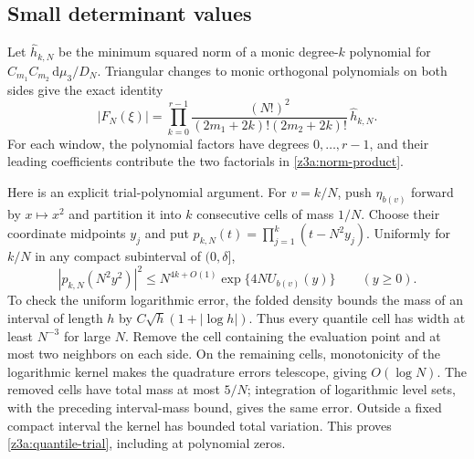 \documentclass[11pt]{article}
\theoremstyle{definition}\newtheorem{definition}[theorem]{Definition}
\theoremstyle{remark}\newtheorem{remark}[theorem]{Remark}
\begin{document}
\subsection{Small determinant values}

Let $\widehat h_{k,N}$ be the minimum squared norm of a monic degree-$k$
polynomial for $C_{m_1}C_{m_2}\,\mathrm d\mu_3/D_N$.  Triangular changes to
monic orthogonal polynomials on both sides give the exact identity
\begin{equation}\label{z3a:norm-product}
 |F_N(\xi)|=\prod_{k=0}^{r-1}
 \frac{(N!)^2}{(2m_1+2k)!(2m_2+2k)!}\,\widehat h_{k,N}.
\end{equation}
For each window, the polynomial factors have degrees $0,\ldots,r-1$, and their leading coefficients contribute the two factorials in \eqref{z3a:norm-product}.

Here is an explicit trial-polynomial argument.  For $v=k/N$, push $\eta_{b(v)}$
forward by $x\mapsto x^2$ and partition it into $k$ consecutive cells of
mass $1/N$.  Choose their coordinate midpoints $y_j$ and put
$p_{k,N}(t)=\prod_{j=1}^k(t-N^2y_j)$.  Uniformly for $k/N$ in any compact
subinterval of $(0,\delta]$,
\begin{equation}\label{z3a:quantile-trial}
 |p_{k,N}(N^2y^2)|^2
 \le N^{4k+O(1)}\exp\{4NU_{b(v)}(y)\}\qquad(y\ge0).
\end{equation}
To check the uniform logarithmic error, the folded density bounds the
mass of an interval of length $h$ by $C\sqrt h(1+|\log h|)$.  Thus every
quantile cell has width at least $N^{-3}$ for large $N$.  Remove the cell
containing the evaluation point and at most two neighbors on each side.
On the remaining cells, monotonicity of the logarithmic kernel makes the
quadrature errors telescope, giving $O(\log N)$.  The removed cells have
total mass at most $5/N$; integration of logarithmic level sets, with
the preceding interval-mass bound, gives the same error.  Outside a fixed
compact interval the kernel has bounded total variation.  This proves
\eqref{z3a:quantile-trial}, including at polynomial zeros.
\end{document}
